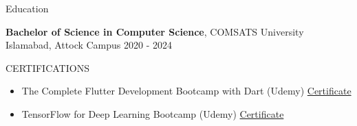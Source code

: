 \documentclass{resume} %
\begin{document}
\begin{rSection}{Education}

{\bf Bachelor of Science in Computer Science}, COMSATS University Islamabad, Attock Campus \hfill {2020 - 2024}

\end{rSection}



\begin{rSection}{CERTIFICATIONS}
\begin{itemize}
    \item The Complete Flutter Development Bootcamp with Dart (Udemy) \href{https://www.udemy.com/certificate/UC-ba57466f-1eaa-48cf-b8c6-621285b2e9c3/}{Certificate}
    \item TensorFlow for Deep Learning Bootcamp (Udemy) \href{https://www.udemy.com/certificate/UC-1cb41d5b-3620-41a2-aa82-33cb4ffe18a7/}{Certificate}
\end{itemize}

\end{rSection}
\end{document}
